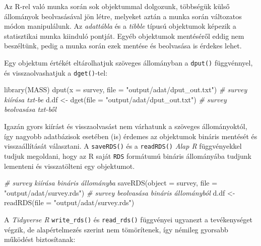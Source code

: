 \documentclass[
]{book}
\newenvironment{Shaded}{\begin{snugshade}}{\end{snugshade}}
\newcommand{\AttributeTok}[1]{\textcolor[rgb]{0.77,0.63,0.00}{#1}}
\newcommand{\CommentTok}[1]{\textcolor[rgb]{0.56,0.35,0.01}{\textit{#1}}}
\newcommand{\FunctionTok}[1]{\textcolor[rgb]{0.00,0.00,0.00}{#1}}
\newcommand{\NormalTok}[1]{#1}
\newcommand{\OtherTok}[1]{\textcolor[rgb]{0.56,0.35,0.01}{#1}}
\newcommand{\StringTok}[1]{\textcolor[rgb]{0.31,0.60,0.02}{#1}}
\begin{document}
Az R-rel való munka során sok objektummal dolgozunk, többségük külső állományok beolvasásával jön létre, melyeket aztán a munka során változatos módon manipulálunk. Az \emph{adattábla} és a \emph{tibble} típusú objektumok képezik a statisztikai munka kiinduló pontját. Egyéb objektumok mentéséről eddig nem beszéltünk, pedig a munka során ezek mentése és beolvasása is érdekes lehet.

Egy objektum értékét eltárolhatjuk szöveges állományban a \texttt{dput()} függvénnyel, és visszaolvashatjuk a \texttt{dget()}-tel:

\begin{Shaded}
\begin{Highlighting}[]
\FunctionTok{library}\NormalTok{(MASS)}
\FunctionTok{dput}\NormalTok{(}\AttributeTok{x =}\NormalTok{ survey, }\AttributeTok{file =} \StringTok{"output/adat/dput\_out.txt"}\NormalTok{)  }\CommentTok{\# survey kiírása txt{-}be         }
\NormalTok{d.df }\OtherTok{\textless{}{-}} \FunctionTok{dget}\NormalTok{(}\AttributeTok{file =} \StringTok{"output/adat/dput\_out.txt"}\NormalTok{)      }\CommentTok{\# survey beolvasása txt{-}ből        }
\end{Highlighting}
\end{Shaded}

Igazán gyors kiírást és visszaolvasást nem várhatunk a szöveges állományoktól, így nagyobb adatbázisok esetében (is) érdemes az objektumok bináris mentését és visszaállítását választani. A \texttt{saveRDS()} és a \texttt{readRDS()} \emph{Alap R} függvényekkel tudjuk megoldani, hogy az R saját \texttt{RDS} formátumú bináris állományába tudjunk lementeni és visszatölteni egy objektumot.

\begin{Shaded}
\begin{Highlighting}[]
\CommentTok{\# survey kiírása bináris állományba}
\FunctionTok{saveRDS}\NormalTok{(}\AttributeTok{object =}\NormalTok{ survey, }\AttributeTok{file =} \StringTok{"output/adat/survey.rds"}\NormalTok{) }
\CommentTok{\# survey beolvasása bináris állományból}
\NormalTok{d.df }\OtherTok{\textless{}{-}} \FunctionTok{readRDS}\NormalTok{(}\AttributeTok{file =} \StringTok{"output/adat/survey.rds"}\NormalTok{)          }
\end{Highlighting}
\end{Shaded}

A \emph{Tidyverse R} \texttt{write\_rds()} és \texttt{read\_rds()} függvényei ugyanezt a tevékenységet végzik, de alapértelmezés szerint nem tömörítenek, így némileg gyorsabb működést biztosítanak:
\end{document}
